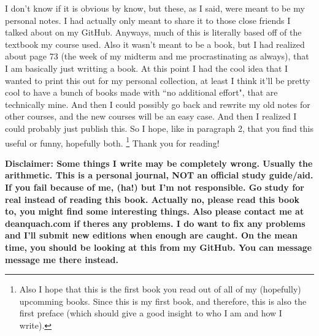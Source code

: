 \documentclass[12pt]{book}
\begin{document}
I don't know if it is obvious by know, but these, as I said, were meant to be my personal notes. 
I had actually only meant to share it to those close friends I talked about on my GitHub.
Anyways, much of this is literally based off of the textbook my course used. 
Also it wasn't meant to be a book, but I had realized about page 73 (the week of my midterm and me procrastinating as always), that I am basically just writting a book. 
At this point I had the cool idea that I wanted to print this out for my personal collection, at least I think it'll be pretty cool to have a bunch of books made with ``no additional effort", that are technically mine. 
And then I could possibly go back and rewrite my old notes for other courses, and the new courses will be an easy case. 
And then I realized I could probably just publish this. So I hope, like in paragraph 2, that you find this useful or funny, hopefully both.
\footnote{Also I hope that this is the first book you read out of all of my (hopefully) upcomming books. Since this is my first book, and therefore, this is also the first preface (which should give a good insight to who I am and how I write).} 
Thank you for reading!

\begin{center}
\textbf{Disclaimer: Some things I write may be completely wrong. Usually the arithmetic. This is a personal journal, NOT an official study guide/aid. If you fail because of me, (ha!) but I'm not responsible. Go study for real instead of reading this book. Actually no, please read this book to, you might find some interesting things. Also please contact me at deanquach.com if theres any problems. I do want to fix any problems and I'll submit new editions when enough are caught. On the mean time, you should be looking at this from my GitHub. You can message message me there instead.} 
\end{center}








%
\tableofcontents
%
\mainmatter
%
\end{document}
